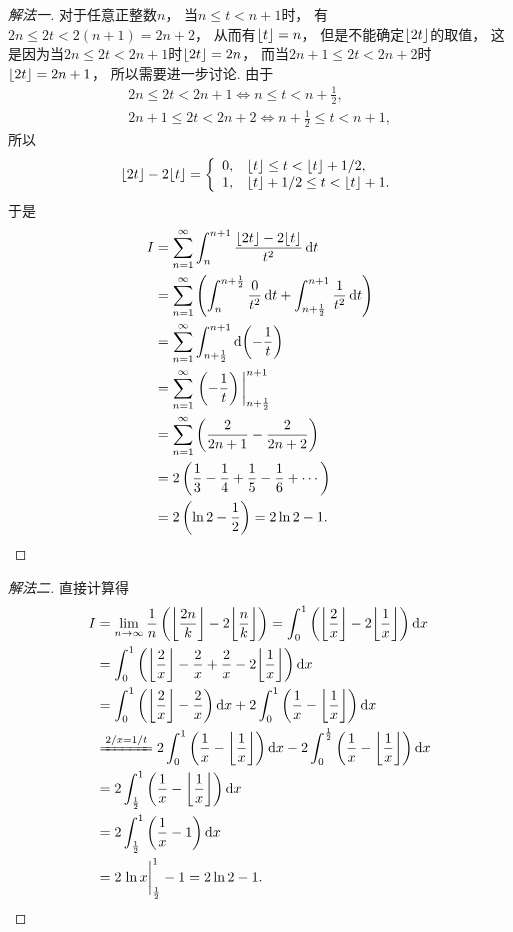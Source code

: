 \begin{example}
\begin{solution}
\begin{proof}[解法一]
对于任意正整数\(n\)，
当\(n \leq t < n+1\)时，
有\(2n \leq 2t < 2(n+1) = 2n+2\)，
从而有\(\lfloor t\rfloor = n\)，
但是不能确定\(\lfloor2t\rfloor\)的取值，
这是因为当\(2n \leq 2t < 2n+1\)时\(\lfloor2t\rfloor = 2n\)，
而当\(2n+1 \leq 2t < 2n+2\)时\(\lfloor2t\rfloor = 2n+1\)，
所以需要进一步讨论.
由于\begin{gather*}
	2n \leq 2t < 2n+1
	\iff
	n \leq t < n+\frac12, \\
	2n+1 \leq 2t < 2n+2
	\iff
	n+\frac12 \leq t < n+1,
\end{gather*}
所以\[
	\lfloor2t\rfloor - 2\lfloor t\rfloor
	= \left\{ \begin{array}{cl}
		0, & \lfloor t\rfloor \leq t < \lfloor t\rfloor+1/2, \\
		1, & \lfloor t\rfloor+1/2 \leq t < \lfloor t\rfloor+1.
	\end{array} \right.
\]
于是\begin{align*}
	I &= \sum_{n=1}^\infty \int_n^{n+1} \frac{\floor{2t}-2\floor{t}}{t^2} \dd{t} \\
	&= \sum_{n=1}^\infty \left(
		\int_n^{n+\frac12} \frac{0}{t^2} \dd{t}
		+ \int_{n+\frac12}^{n+1} \frac{1}{t^2} \dd{t}
	\right) \\
	&= \sum_{n=1}^\infty \int_{n+\frac12}^{n+1} \dd(-\frac1t) \\
	&= \sum_{n=1}^\infty \eval{\left( -\frac1t \right)}_{n+\frac12}^{n+1} \\
	&= \sum_{n=1}^\infty \left( \frac2{2n+1} - \frac2{2n+2} \right) \\
	&= 2 \left( \frac13 - \frac14 + \frac15 - \frac16 + \dotsb \right) \\
	&= 2 \left( \ln2 - \frac12 \right)
	= 2\ln2 - 1.
\end{align*}
\end{proof}
\begin{proof}[解法二]
直接计算得\begin{align*}
	I &= \lim_{n\to\infty} \frac1n \left( \floor*{\frac{2n}{k}} - 2 \floor*{\frac{n}{k} \vphantom{\frac{2n}{k}}} \right)
	= \int_0^1 \left( \floor*{\frac2x} - 2 \floor*{\frac1x} \right) \dd{x} \\
	&= \int_0^1 \left( \floor*{\frac2x} - \frac2x + \frac2x - 2 \floor*{\frac1x} \right) \dd{x} \\
	&= \int_0^1 \left( \floor*{\frac2x} - \frac2x \right) \dd{x}
	+ 2 \int_0^1 \left( \frac1x - \floor*{\frac1x} \right) \dd{x} \\
	&\xlongequal{2/x=1/t}
	2 \int_0^1 \left( \frac1x - \floor*{\frac1x} \right) \dd{x}
	- 2 \int_0^{\frac12} \left( \frac1x - \floor*{\frac1x} \right) \dd{x} \\
	&= 2 \int_{\frac12}^1 \left( \frac1x - \floor*{\frac1x} \right) \dd{x} \\
	&= 2 \int_{\frac12}^1 \left( \frac1x - 1 \right) \dd{x} \\
	&= 2 \eval{\ln x}_{\frac12}^1 - 1
	= 2\ln2 - 1.
\end{align*}
\end{proof}
\end{solution}
\end{example}
